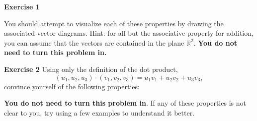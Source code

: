 \documentclass[12pt,oneside]{exam}
\newenvironment{exercise}[1]{\vspace{.1in}\noindent\textbf{Exercise #1 \hspace{.05em}}}{}
\begin{document}
\begin{exercise}{1}
You should attempt to visualize each of these properties by drawing the associated vector diagrams. Hint: for all but the associative property for addition, you can assume that the vectors are contained in the plane $\mathbb{R}^2$. \textbf{You do not need to turn this problem in.} 
\end{exercise}

\begin{exercise}{2}
Using only the definition of the dot product, 
\begin{equation*}
(u_1,u_2,u_3)\cdot (v_1,v_2,v_3) = u_1v_1+u_2v_2+u_3v_3,
\end{equation*}
convince yourself of the following properties: 
\textbf{You do not need to turn this problem in}. If any of these properties is not clear to you, try using a few examples to understand it better. 
\end{exercise}
\end{document}
